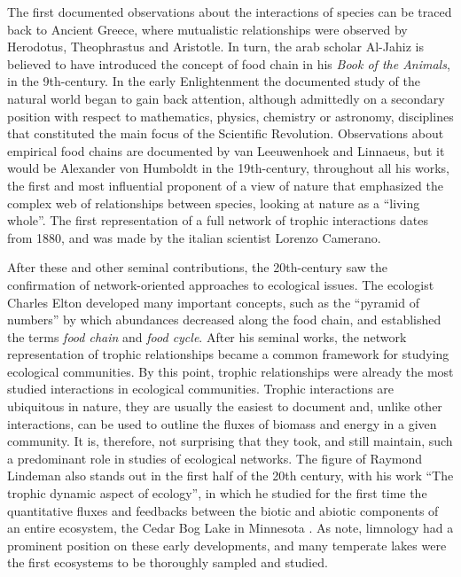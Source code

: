 The first documented observations about the interactions of species can be traced back to Ancient Greece, where mutualistic relationships were observed by Herodotus, Theophrastus and Aristotle. In turn, the arab scholar Al-Jahiz is believed to have introduced the concept of food chain in his \textit{Book of the Animals}, in the 9th-century. In the early Enlightenment the documented study of the natural world began to gain back attention, although admittedly on a secondary position with respect to mathematics, physics, chemistry or astronomy, disciplines that constituted the main focus of the Scientific Revolution. Observations about empirical food chains are documented by van Leeuwenhoek and Linnaeus, but it would be Alexander von Humboldt in the 19th-century, throughout all his works, the first and most influential proponent of a view of nature that emphasized the complex web of relationships between species, looking at nature as a ``living whole''. The first representation of a full network of trophic interactions dates from 1880, and was made by the italian scientist Lorenzo Camerano.

After these and other seminal contributions, the 20th-century saw the confirmation of network-oriented approaches to ecological issues. The ecologist Charles Elton developed many important concepts, such as the ``pyramid of numbers'' by which abundances decreased along the food chain, and established the terms \textit{food chain} and \textit{food cycle}. After his seminal works, the network representation of trophic relationships became a common framework for studying ecological communities. By this point, trophic relationships were already the most studied interactions in ecological communities. Trophic interactions are ubiquitous in nature, they are usually the easiest to document and, unlike other interactions, can be used to outline the fluxes of biomass and energy in a given community. It is, therefore, not surprising that they took, and still maintain, such a predominant role in studies of ecological networks. The figure of Raymond Lindeman also stands out in the first half of the 20th century, with his work ``The trophic dynamic aspect of ecology'', in which he studied for the first time the quantitative fluxes and feedbacks between the biotic and abiotic components of an entire ecosystem, the Cedar Bog Lake in Minnesota \citep{Lindeman1942}. As \cite{Ings2018} note, limnology had a prominent position on these early developments, and many temperate lakes were the first ecosystems to be thoroughly sampled and studied.

